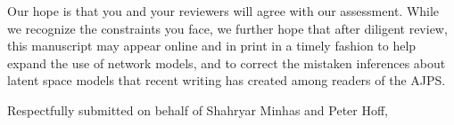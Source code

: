 \documentclass[12pt]{letter}
\begin{document}
\begin{letter}
Our hope is that you and your reviewers will agree with our assessment. While we recognize the constraints you face, we further hope that after diligent review, this manuscript may appear online and in print in a timely fashion to help expand the use of network models, and to correct the mistaken inferences about latent space models that recent writing has created among readers of the AJPS. 

\closing{Respectfully submitted on behalf of Shahryar Minhas and Peter Hoff,} \vspace{.1in}


\end{letter}
\end{document}
